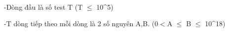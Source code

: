 -Dòng đầu là số test T (T $\le$ 10^5)  

   -T dòng tiếp theo mỗi dòng là 2 số nguyên A,B. (0$<$A $\le$ B $\le$ 10^18)